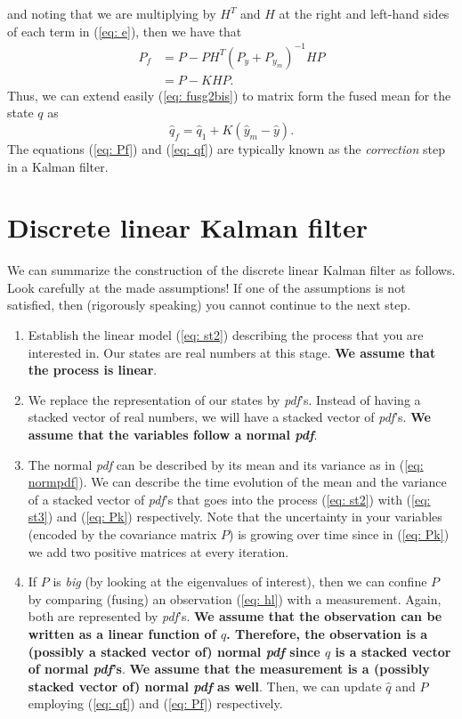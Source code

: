 \documentclass[11pt,a4paper]{article}
\begin{document}
and noting that we are multiplying by $H^T$ and $H$ at the right and left-hand sides of each term in (\ref{eq: e}), then we have that
\begin{align}
	P_f &= P - PH^T(P_y + P_{y_m})^{-1} HP \nonumber \\
	&= P - KHP. \label{eq: Pf}
\end{align}
Thus, we can extend easily (\ref{eq: fusg2bis}) to matrix form the fused mean for the state $q$ as
\begin{equation}
	\hat q_f = \hat q_1 + K(\hat y_m - \hat y).
	\label{eq: qf}
\end{equation}
The equations (\ref{eq: Pf}) and (\ref{eq: qf}) are typically known as the \emph{correction} step in a Kalman filter.

\section{Discrete linear Kalman filter}
\label{sec: dlkf}
We can summarize the construction of the discrete linear Kalman filter as follows. Look carefully at the made assumptions! If one of the assumptions is not satisfied, then (rigorously speaking) you cannot continue to the next step.

\begin{enumerate}
	\item Establish the linear model (\ref{eq: st2}) describing the process that you are interested in. Our states are real numbers at this stage. {\bf We assume that the process is linear}.
	\item We replace the representation of our states by \emph{pdf}'s. Instead of having a stacked vector of real numbers, we will have a stacked vector of \emph{pdf}'s. {\bf We assume that the variables follow a normal \emph{pdf}}.
	\item The normal \emph{pdf} can be described by its mean and its variance as in (\ref{eq: normpdf}). We can describe the time evolution of the mean and the variance of a stacked vector of \emph{pdf}'s that goes into the process (\ref{eq: st2}) with (\ref{eq: st3}) and (\ref{eq: Pk}) respectively. Note that the uncertainty in your variables (encoded by the covariance matrix $P$) is growing over time since in (\ref{eq: Pk}) we add two positive matrices at every iteration.
	\item If $P$ is \emph{big} (by looking at the eigenvalues of interest), then we can confine $P$ by comparing (fusing) an observation (\ref{eq: hl}) with a measurement. Again, both are represented by \emph{pdf}'s. {\bf We assume that the observation can be written as a linear function of $q$. Therefore, the observation is a (possibly a stacked vector of) normal \emph{pdf} since $q$ is a stacked vector of normal \emph{pdf}'s}. {\bf We assume that the measurement is a (possibly stacked vector of) normal \emph{pdf} as well}. Then, we can update $\hat q$ and $P$ employing (\ref{eq: qf}) and (\ref{eq: Pf}) respectively.
\end{enumerate}
\end{document}
